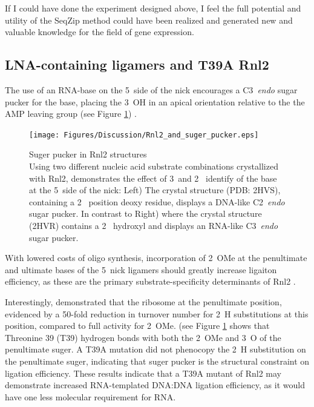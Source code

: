     If I could have done the experiment designed above, I feel the full potential and utility of the SeqZip method could have been realized and generated new and valuable knowledge for the field of gene expression.

  \subsection{LNA-containing ligamers and T39A Rnl2}
    \label{Disc:subsec:LNA-Containing ligamers and T39A Rnk2}

    The use of an RNA-base on the 5\textprime~side of the nick encourages a C3\textprime~\textit{endo} sugar pucker for the base, placing the 3\textprime~OH in an apical orientation relative to the the AMP leaving group (see Figure \ref{Disc:fig:Rnl2 and suger pucker}) \citep{Nandakumar2006}.

    \begin{figure} %
      \centering 
      \texttt{[image: Figures/Discussion/Rnl2\_and\_suger\_pucker.eps]}
      \caption[Suger pucker in Rnl2 structures]
      {Suger pucker in Rnl2 structures \\[0.25cm]
        Using two different nucleic acid substrate combinations crystallized with Rnl2, \citet{Nandakumar2006} demonstrates the effect of 3\textprime~and 2\textprime~ identify of the base at the 5\textprime~side of the nick: Left) The crystal structure (PDB: 2HVS), containing a 2\textprime~ position deoxy residue, displays a DNA-like C2\textprime~\textit{endo} sugar pucker. In contrast to Right) where the crystal structure (2HVR) contains a 2\textprime~ hydroxyl and displays an RNA-like C3\textprime~\textit{endo} sugar pucker.
        }
        \label{Disc:fig:Rnl2 and suger pucker}
        \end{figure}

    With lowered costs of oligo synthesis, incorporation of 2\textprime~OMe at the penultimate and ultimate bases of the 5\textprime~nick ligamers should greatly increase ligaiton efficiency, as these are the primary substrate-specificity determinants of Rnl2 \citep{Nandakumar2004a, Nandakumar2006}.

    Interestingly, \citet{Nandakumar2004a} demonstrated that the ribosome at the penultimate position, evidenced by a 50-fold reduction in turnover number for 2\textprime~H substitutions at this position, compared to full activity for 2\textprime~OMe. \citet{Nandakumar2006} (see Figure \ref{Disc:fig:Rnl2 and suger pucker} shows that Threonine 39 (T39) hydrogen bonds with both the 2\textprime~OMe and 3\textprime~O of the penultimate suger. A T39A mutation did not phenocopy the 2\textprime~H substitution on the penultimate suger, indicating that suger pucker is the structural constraint on ligation efficiency. These results indicate that a T39A mutant of Rnl2 may demonstrate increased RNA-templated DNA:DNA ligation efficiency, as it would have one less molecular requirement for RNA.

